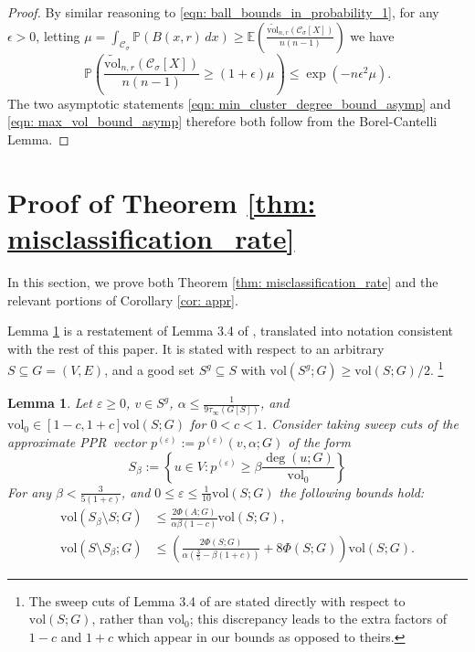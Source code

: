 \documentclass[11pt,twoside]{article}
\newtheorem{lemma}{Lemma}
\newcommand{\vol}{\mathrm{vol}}
\newcommand{\1}{\mathbf{1}}
\newcommand{\pbf}{p}        %
\newcommand{\Xbf}{X}             %
\newcommand{\Pbb}{\mathbb{P}}
\newcommand{\Ebb}{\mathbb{E}}
\newcommand{\Cset}{\mathcal{C}}
\newcommand{\Csig}{\Cset_{\sigma}}
\newcommand{\dx}{\,dx}
\newcommand{\pprspace}{{\sc PPR~}}
\begin{document}
\begin{proof}
	By similar reasoning to \eqref{eqn: ball_bounds_in_probability_1}, for any $\epsilon > 0$, letting $\mu = \int_{\Csig} \Pbb(B(x,r) \dx) \geq \Ebb\left(\frac{\widetilde{\vol}_{n,r}(\Csig[\Xbf])}{n(n-1)}\right)$ we have
	\begin{equation*}
	\Pbb\left(\frac{\widetilde{\vol}_{n,r}(\Csig[\Xbf])}{n(n-1)} \geq (1 + \epsilon)\mu \right) \leq \exp(-n\epsilon^2\mu).
	\end{equation*}
	The two asymptotic statements \eqref{eqn: min_cluster_degree_bound_asymp} and \eqref{eqn: max_vol_bound_asymp} therefore both follow from the Borel-Cantelli Lemma.
\end{proof}




\section{Proof of Theorem \ref{thm: misclassification_rate}}
\label{sec: proof_of_misclassification_rate}
In this section, we prove both Theorem \ref{thm: misclassification_rate} and the relevant portions of Corollary \ref{cor: appr}.

Lemma \ref{lem: zhu} is a restatement of Lemma 3.4 of \cite{zhu2013}, translated into notation consistent with the rest of this paper. It is stated with respect to an arbitrary $S \subseteq G = (V,E)$, and a good set $S^g \subseteq S$ with $\vol(S^g; G) \geq \vol(S; G)/2$. \footnote{The sweep cuts of Lemma 3.4 of \cite{zhu2013} are stated directly with respect to $\vol(S;G)$, rather than $\vol_0$; this discrepancy leads to the extra factors of $1 - c$ and $1 + c$ which appear in our bounds as opposed to theirs.}

\begin{lemma}
	\label{lem: zhu}
	Let $\varepsilon \geq 0$, $v \in S^g$, $\alpha \leq \frac{1}{9\tau_{\infty}(G[S])}$, and $\vol_0 \in [1 - c,1 + c] \vol(S;G)$ for $0 < c < 1$. Consider taking sweep cuts of the approximate \pprspace vector $\pbf^{(\varepsilon)} := \pbf^{(\varepsilon)}(v,\alpha; G)$ of the form
	\begin{equation*}
	S_{\beta} := \left\{u \in V: \pbf^{(\varepsilon)} \geq \beta \frac{\deg(u; G)}{\vol_0} \right\}
	\end{equation*}
	For any $\beta < \frac{3}{5(1 + c)}$, and $0 \leq \varepsilon \leq \frac{1}{10} \vol(S;G)$ the following bounds hold:
	\begin{align}
	\vol(S_{\beta} \setminus S; G) & \leq \frac{2\Phi(A;G)}{\alpha \beta(1 - c)} \vol(S; G), \label{eqn: zhu_1}\\
	\vol(S \setminus S_{\beta}; G) & \leq \left(\frac{2\Phi(S;G)}{\alpha (\frac{3}{5} - \beta(1 + c))} + 8\Phi(S;G)\right)\vol(S; G).  \label{eqn: zhu_2}
	\end{align}
\end{lemma}
\end{document}
